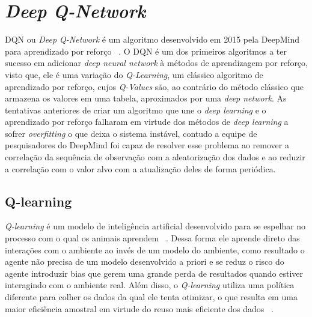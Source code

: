 

\chapter{\emph{Deep Q-Network}}
\label{cap:dqn}

\label{sec:o-que-e-dqn}

\enlargethispage{.5\baselineskip}
DQN ou \emph{Deep Q-Network} é um algoritmo desenvolvido em 2015 pela DeepMind para aprendizado por reforço ~\citep{Human-level-control}. O DQN é um dos primeiros algoritmos a ter sucesso em adicionar \emph{deep neural network} à métodos de aprendizagem por reforço, visto que, ele é uma variação do \emph{Q-Learning}, um clássico algoritmo de aprendizado por reforço, cujos \emph{Q-Values} são, ao contrário do método clássico que armazena os valores em uma tabela, aproximados por uma \emph{deep network}. As tentativas anteriores de criar um algoritmo que une o \emph{deep learning} e o aprendizado por reforço falharam em virtude dos métodos de \emph{deep learning} a sofrer \emph{overfitting} o que deixa o sistema instável, contudo a equipe de pesquisadores do DeepMind foi capaz de resolver esse problema ao remover a correlação da sequência de observação com a aleatorização dos dados e ao reduzir a correlação com o valor alvo com a atualização deles de forma periódica.

\section{Q-learning}
\label{sec:q-learning}

\enlargethispage{.5\baselineskip}

\emph{Q-learning} é um modelo de inteligência artificial desenvolvido para se espelhar no processo com o qual os animais aprendem ~\citep{Watkins:PhD}. Dessa forma ele aprende direto das interações com o ambiente ao invés de um modelo do ambiente, como resultado o agente não precisa de um modelo desenvolvido a priori e se reduz o risco do agente introduzir bias que gerem uma grande perda de resultados quando estiver interagindo com o ambiente real. Além disso, o \emph{Q-learning} utiliza uma política diferente para colher os dados da qual ele tenta otimizar, o que resulta em uma maior eficiência amostral em virtude do reuso mais eficiente dos dados ~\citep{Nguyen_La_2019}.


